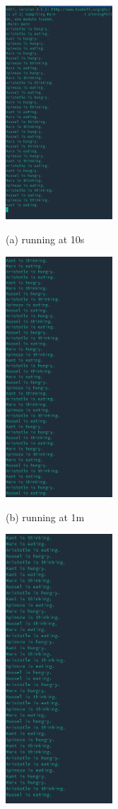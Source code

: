 \documentclass{article}
\begin{document}
\begin{normalsize}
\begin{figure}[H]
    \begin{minipage}[b]{0.24\linewidth}
      \centering
      \centerline{\includegraphics[width=4.0cm]{dinning10s}}
      \centerline{ (a) running at 10s}\medskip
    \end{minipage}
    \hfill
    \begin{minipage}[b]{0.24\linewidth}
      \centering
      \centerline{\includegraphics[width=4.0cm]{dinngin1m}}
      \centerline{ (b) running at 1m}\medskip
    \end{minipage}
    \hfill
    \begin{minipage}[b]{0.24\linewidth}
      \centering
      \centerline{\includegraphics[width=4.0cm]{dinning2m}}

\end{minipage}
\end{figure}
\end{normalsize}
\end{document}
